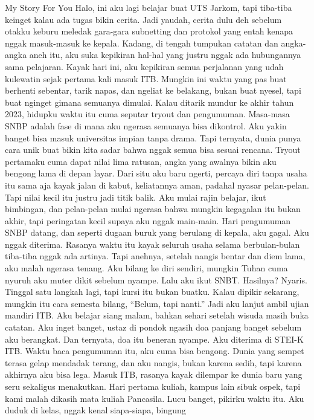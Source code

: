 \documentclass[
  letterpaper,
  DIV=11,
  numbers=noendperiod]{scrreprt}
\begin{document}
My Story For You Halo, ini aku lagi belajar buat UTS Jarkom, tapi
tiba-tiba keinget kalau ada tugas bikin cerita. Jadi yaudah, cerita dulu
deh sebelum otakku keburu meledak gara-gara subnetting dan protokol yang
entah kenapa nggak masuk-masuk ke kepala. Kadang, di tengah tumpukan
catatan dan angka-angka aneh itu, aku suka kepikiran hal-hal yang justru
nggak ada hubungannya sama pelajaran. Kayak hari ini, aku kepikiran
semua perjalanan yang udah kulewatin sejak pertama kali masuk ITB.
Mungkin ini waktu yang pas buat berhenti sebentar, tarik napas, dan
ngeliat ke belakang, bukan buat nyesel, tapi buat nginget gimana
semuanya dimulai. Kalau ditarik mundur ke akhir tahun 2023, hidupku
waktu itu cuma seputar tryout dan pengumuman. Masa-masa SNBP adalah fase
di mana aku ngerasa semuanya bisa dikontrol. Aku yakin banget bisa masuk
universitas impian tanpa drama. Tapi ternyata, dunia punya cara unik
buat bikin kita sadar bahwa nggak semua bisa sesuai rencana. Tryout
pertamaku cuma dapat nilai lima ratusan, angka yang awalnya bikin aku
bengong lama di depan layar. Dari situ aku baru ngerti, percaya diri
tanpa usaha itu sama aja kayak jalan di kabut, keliatannya aman, padahal
nyasar pelan-pelan. Tapi nilai kecil itu justru jadi titik balik. Aku
mulai rajin belajar, ikut bimbingan, dan pelan-pelan mulai ngerasa bahwa
mungkin kegagalan itu bukan akhir, tapi peringatan kecil supaya aku
nggak main-main. Hari pengumuman SNBP datang, dan seperti dugaan buruk
yang berulang di kepala, aku gagal. Aku nggak diterima. Rasanya waktu
itu kayak seluruh usaha selama berbulan-bulan tiba-tiba nggak ada
artinya. Tapi anehnya, setelah nangis bentar dan diem lama, aku malah
ngerasa tenang. Aku bilang ke diri sendiri, mungkin Tuhan cuma nyuruh
aku muter dikit sebelum nyampe. Lalu aku ikut SNBT. Hasilnya? Nyaris.
Tinggal satu langkah lagi, tapi kursi itu bukan buatku. Kalau dipikir
sekarang, mungkin itu cara semesta bilang, ``Belum, tapi nanti.'' Jadi
aku lanjut ambil ujian mandiri ITB. Aku belajar siang malam, bahkan
sehari setelah wisuda masih buka catatan. Aku inget banget, ustaz di
pondok ngasih doa panjang banget sebelum aku berangkat. Dan ternyata,
doa itu beneran nyampe. Aku diterima di STEI-K ITB. Waktu baca
pengumuman itu, aku cuma bisa bengong. Dunia yang sempet terasa gelap
mendadak terang, dan aku nangis, bukan karena sedih, tapi karena
akhirnya aku bisa lega. Masuk ITB, rasanya kayak dilempar ke dunia baru
yang seru sekaligus menakutkan. Hari pertama kuliah, kampus lain sibuk
ospek, tapi kami malah dikasih mata kuliah Pancasila. Lucu banget,
pikirku waktu itu. Aku duduk di kelas, nggak kenal siapa-siapa, bingung
\end{document}

